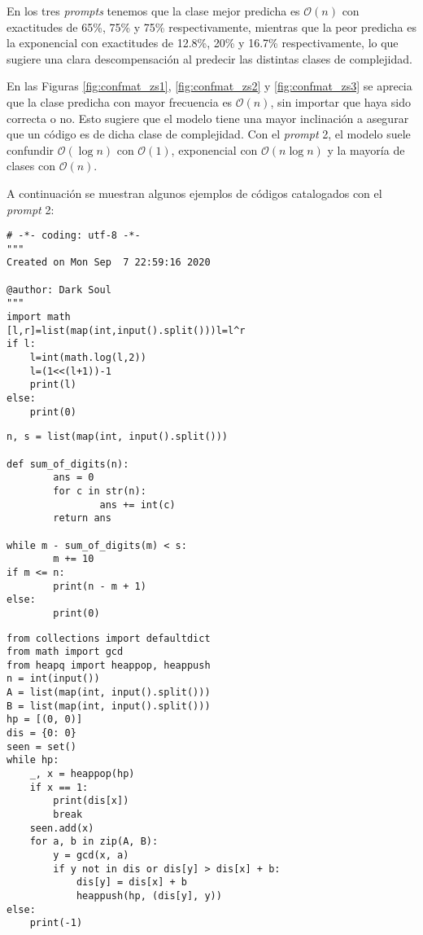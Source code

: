 \documentclass[12pt,twoside]{article}
\begin{document}
En los tres \textit{prompts} tenemos que la clase mejor predicha es $\mathcal{O}(n)$ con exactitudes de 65\%, 75\% y 75\% respectivamente, mientras que la peor predicha es la exponencial con exactitudes de 12.8\%, 20\% y  16.7\% respectivamente, lo que sugiere una clara descompensación al predecir las distintas clases de complejidad.

En las Figuras \ref{fig:confmat_zs1}, \ref{fig:confmat_zs2} y \ref{fig:confmat_zs3} se aprecia que la clase predicha con mayor frecuencia es $\mathcal{O}(n)$, sin importar que haya sido correcta o no. Esto sugiere que el modelo tiene una mayor inclinación a asegurar que un código es de dicha clase de complejidad. Con el \textit{prompt} 2, el modelo suele confundir $\mathcal{O}(\log n)$ con $\mathcal{O}(1)$, exponencial con $\mathcal{O}(n\log n)$ y la mayoría de clases con $\mathcal{O}(n)$.

A continuación se muestran algunos ejemplos de códigos catalogados con el \textit{prompt} 2:

\begin{tcolorbox}[
  colback=gray!5,
  colframe=black,
  boxrule=0.5pt,
  breakable,
  title=$\mathcal{O}(\log n)$ catalogado como $\mathcal{O}(1)$,
]
\begin{verbatim}
# -*- coding: utf-8 -*-
"""
Created on Mon Sep  7 22:59:16 2020 

@author: Dark Soul
"""
import math
[l,r]=list(map(int,input().split()))l=l^r
if l:
    l=int(math.log(l,2))
    l=(1<<(l+1))-1
    print(l)
else:
    print(0)
\end{verbatim}
\end{tcolorbox}

\begin{tcolorbox}[
  colback=gray!5,
  colframe=black,
  boxrule=0.5pt,
  breakable,
  title=$\mathcal{O}(\log n)$ catalogado correctamente,
]
\begin{verbatim}
n, s = list(map(int, input().split()))

def sum_of_digits(n):
        ans = 0
        for c in str(n):
                ans += int(c)
        return ans

while m - sum_of_digits(m) < s:
        m += 10
if m <= n:
        print(n - m + 1)
else:
        print(0)
\end{verbatim}
\end{tcolorbox}

\begin{tcolorbox}[
  colback=gray!5,
  colframe=black,
  boxrule=0.5pt,
  breakable,
  title=Exponencial catalogado como $\mathcal{O}(n\log n)$,
]
\begin{verbatim}
from collections import defaultdict
from math import gcd
from heapq import heappop, heappush
n = int(input())
A = list(map(int, input().split()))
B = list(map(int, input().split()))
hp = [(0, 0)]
dis = {0: 0}
seen = set()
while hp:
    _, x = heappop(hp)
    if x == 1:
        print(dis[x])
        break
    seen.add(x)
    for a, b in zip(A, B):
        y = gcd(x, a)
        if y not in dis or dis[y] > dis[x] + b:
            dis[y] = dis[x] + b
            heappush(hp, (dis[y], y))
else:
    print(-1)
\end{verbatim}
\end{tcolorbox}
\end{document}
